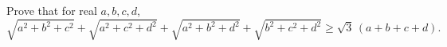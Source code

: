 Prove that for real $a,b,c,d$,
\[\sqrt{a^2+b^2+c^2}+\sqrt{a^2+c^2+d^2}+\sqrt{a^2+b^2+d^2}+\sqrt{b^2+c^2+d^2}\ge\sqrt3\,(a+b+c+d).\]
